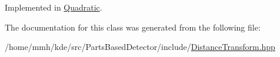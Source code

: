 Implemented in \hyperlink{classQuadratic_ae1f3f6d71209aafe6bb1636a8c17489c}{Quadratic}.



The documentation for this class was generated from the following file\-:\begin{DoxyCompactItemize}
\item 
/home/mmh/kde/src/\-Parts\-Based\-Detector/include/\hyperlink{DistanceTransform_8hpp}{Distance\-Transform.\-hpp}\end{DoxyCompactItemize}
